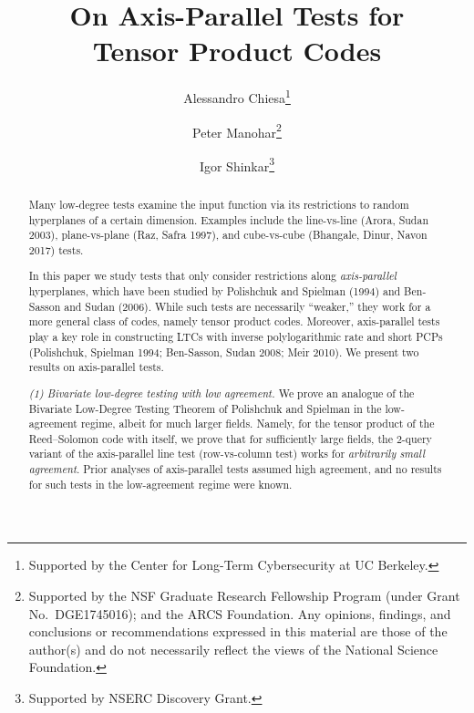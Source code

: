 \documentclass{toc}
\theoremstyle{plain}
\begin{document}
\begin{frontmatter} %

%
  \title{On Axis-Parallel Tests for \\ Tensor Product Codes} 

%
%

%
%
%

%
%
%
%
%
%
%
%
%
%
%
%


%
%
%
%

%

\author[chiesa]{Alessandro Chiesa\thanks{Supported by the Center for Long-Term Cybersecurity at UC Berkeley.}}
\author[manohar]{Peter Manohar\thanks{Supported by the NSF Graduate Research Fellowship Program (under Grant No.\ DGE1745016);
and the ARCS Foundation.
Any opinions, findings, and conclusions or recommendations expressed in this material are those of the author(s) and do not necessarily reflect the views of the National Science Foundation.}}
\author[shinkar]{Igor Shinkar\thanks{Supported by NSERC Discovery Grant.}}

%
%
%
%

%
%
%
%
%
%
\begin{abstract}
Many low-degree tests examine the input function via its restrictions to random hyperplanes of a certain dimension. Examples include the line-vs-line (Arora, Sudan 2003), plane-vs-plane (Raz, Safra 1997), and cube-vs-cube (Bhangale, Dinur, Navon 2017) tests.

In this paper we study tests that only consider restrictions along \emph{axis-parallel} hyperplanes, which have been studied by Polishchuk and Spielman (1994) and Ben-Sasson and Sudan (2006).
While such tests are necessarily ``weaker,'' they work for a more general class of codes, namely tensor product codes.
Moreover, axis-parallel tests play a key role in constructing LTCs with inverse polylogarithmic rate and short PCPs (Polishchuk, Spielman 1994; Ben-Sasson, Sudan 2008; Meir 2010). We present two results on axis-parallel tests.

\smallskip
\emph{(1) Bivariate low-degree testing with
%
low agreement.}   %
We prove an analogue of the Bivariate Low-Degree Testing Theorem of Polishchuk and Spielman in the low-agreement regime, albeit
%
for much larger fields.    %
Namely, for the
%
%
tensor product of the Reed--Solomon code with itself,                       %
we prove that for sufficiently large fields, the $2$-query variant of the axis-parallel line test (row-vs-column test) works for \emph{arbitrarily small agreement}. Prior analyses of axis-parallel tests assumed high agreement, and no results for such tests in the low-agreement regime were known.


\end{abstract}
\end{frontmatter}
\end{document}
